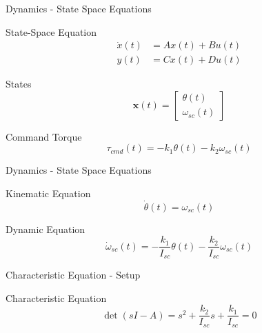 \documentclass{beamer}
\begin{document}
\begin{frame}{Dynamics - State Space Equations}
\begin{block}{State-Space Equation}
\begin{align}
    \dot{x}(t) &= Ax(t) + Bu(t) \\
    y(t) &= Cx(t) + Du(t)
\end{align}
\end{block}
\begin{block}{States}
    \begin{equation}
        \mathbf{x}(t) = \begin{bmatrix} \theta(t) \\ \omega_{sc}(t) \end{bmatrix}
    \end{equation}
\end{block}
\begin{block}{Command Torque}
    \begin{equation}
        \tau_{cmd}(t) = -k_1 \theta(t) - k_2 \omega_{sc}(t)
    \end{equation}
\end{block}
\end{frame}

\begin{frame}{Dynamics - State Space Equations}
\begin{block}{Kinematic Equation}
    \begin{equation}
        \dot{\theta}(t) = \omega_{sc}(t)
    \end{equation} 
\end{block}

\begin{block}{Dynamic Equation}
    \begin{equation}
        \dot{\omega}_{sc}(t) = -\frac{k_1}{I_{sc}} \theta(t) - \frac{k_2}{I_{sc}} \omega_{sc}(t)
    \end{equation}
\end{block}
\end{frame}




\begin{frame}{Characteristic Equation - Setup}
\begin{block}{Characteristic Equation}
    \begin{equation}
        \det(sI - A) = s^2 + \frac{k_2}{I_{sc}}s + \frac{k_1}{I_{sc}} = 0
    \end{equation}   
\end{block}
\end{frame}
\end{document}
